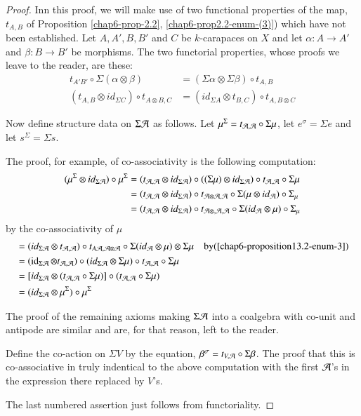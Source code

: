 \begin{proof}
Inn this proof, we will make use of two functional properties of the map, $t_{A, B}$ of Proposition
\ref{chap6-prop-2.2}, \ref{chap6-prop2.2-enum-(3)}) which have not been established. Let $A, A', B, B'$ and $C$ be $k$-carapaces on $X$ and let $\alpha : A \rightarrow A'$ and $ \beta : B \rightarrow B'$ be morphisms. The two functorial properties, whose proofs we leave to the reader, are these:
\begin{align*}\label{chap6-eq-13.3}
t_{A' B'} \circ \Sigma(\alpha \otimes \beta) &= (\Sigma \alpha \otimes \Sigma \beta) \circ t_{A, B}\nonumber\\
(t_{A, B}\otimes id_{\Sigma C}) \circ t_{A \otimes B,C} &= (id_{\Sigma A} \otimes t_{B, C}) \circ t_{A, B \otimes C}\tag{13.3}
\end{align*}

Now define structure data on $\Sigma \mathcal{A}$ as follows. Let $\mu^{\Sigma} = t_{\mathcal{A}, \mathcal{A}} \circ \Sigma\mu$, let $e^{\sigma} = \Sigma e$ and let $s^{\Sigma} = \Sigma s$.

The proof, for example, of co-associativity is the following computation:
\begin{align*}
(\mu^{\Sigma} \otimes id_{\Sigma \mathcal{A}}) \circ \mu^{\Sigma} &= (t_{\mathcal{A}, \mathcal{A}} \otimes id_{\Sigma \mathcal{A}}) \circ ((\Sigma\mu) \otimes id_{\Sigma \mathcal{A}}) \circ t_{\mathcal{A}, \mathcal{A}} \circ \Sigma\mu \\
&= (t_{\mathcal{A}, \mathcal{A}} \otimes id_{\Sigma \mathcal{A}}) \circ  t_{\mathcal{A} \otimes \mathcal{A}, \mathcal{A}} \circ \Sigma(\mu \otimes id_{\mathcal{A}}) \circ \Sigma_{\mu}\\
&= (t_{\mathcal{A}, \mathcal{A}} \otimes id_{\Sigma\mathcal{A}}) \circ t_{\mathcal{A} \otimes, \mathcal{A}, \mathcal{A}} \circ \Sigma(id_{\mathcal{A}} \otimes \mu) \circ \Sigma_{\mu}
\end{align*}
by the co-associativity of $\mu$
\begin{align*}
& = (id_{\Sigma\mathcal{A}} \otimes t_{\mathcal{A}, \mathcal{A}}) \circ t_{A\mathcal{A}, \mathcal{A} \otimes \mathcal{A}} \circ \Sigma(id_{\mathcal{A}} \otimes \mu) \otimes \Sigma\mu \quad \text{by} (\ref{chap6-proposition13.2-enum-3})\\
&= (\operatorname{id}_{\Sigma \mathcal{A}} \otimes t_{\mathcal{A}, \mathcal{A}}) \circ (id_{\Sigma \mathcal{A}} \otimes \Sigma\mu) \circ t_{\mathcal{A}, \mathcal{A}} \circ \Sigma\mu\\
&=[id_{\Sigma \mathcal{A}} \otimes (t_{\mathcal{A}, \mathcal{A}} \circ \Sigma\mu)]\circ (t_{\mathcal{A}, \mathcal{A}} \circ \Sigma\mu)\\
&= (id_{\Sigma \mathcal{A}} \otimes \mu^{\Sigma}) \circ \mu^{\Sigma}
\end{align*}

The proof of the remaining axioms making $\Sigma \mathcal{A}$ into a coalgebra with co-unit and antipode are similar and are, for that reason, left to the reader.

Define the co-action on $\Sigma V$ by the equation, $\beta^{\sigma} = t_{V, \mathcal{A}} \circ \Sigma \beta$. The proof that this is co-associative in truly indentical to the above computation with the first $\mathcal{A}$'s in the expression there replaced by $V$'s.

The last numbered assertion just follows from functoriality.
\end{proof}

